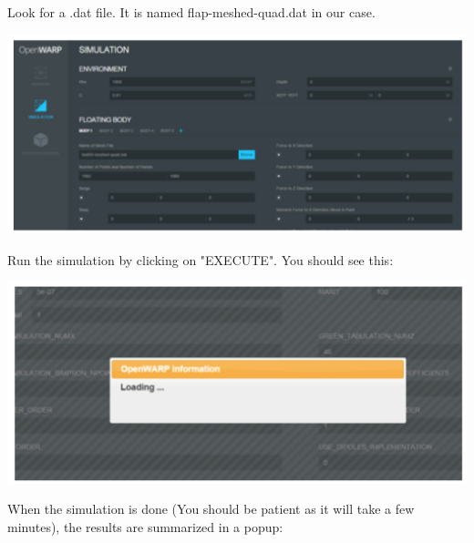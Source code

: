 \documentclass[12pt]{article}
\begin{document}
Look for a .dat file. It is named flap-meshed-quad.dat in our case.

\vspace{\abovedisplayskip}
\begin{minipage}{\linewidth}
	\centering
	\includegraphics[scale=0.5]{img/48}
\end{minipage}
\vspace{\belowdisplayskip}

Run the simulation by clicking on "EXECUTE". You should see this:

\vspace{\abovedisplayskip}
\begin{minipage}{\linewidth}
	\centering
	\includegraphics[scale=0.5]{img/49}
\end{minipage}
\vspace{\belowdisplayskip}

When the simulation is done (You should be patient as it will take a few minutes), the results are summarized in a popup:
\end{document}
